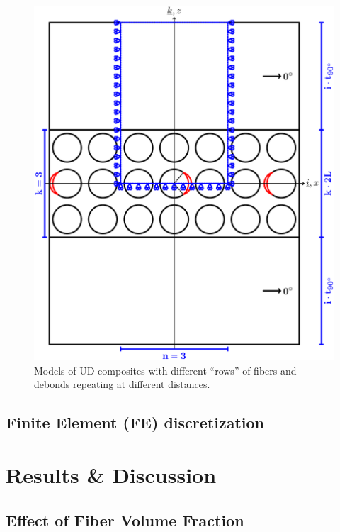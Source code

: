 \documentclass[review]{elsarticle}
\begin{document}
\begin{figure}[!h]
\centering
        \includegraphics[width=\textwidth]{thickPly.pdf}
\caption{Models of UD composites with different ``rows'' of fibers and debonds repeating at different distances.}\label{fig:laminateModelsB}
\end{figure}

\subsection{Finite Element (FE) discretization}



\section{Results \& Discussion}

\subsection{Effect of Fiber Volume Fraction}
\end{document}
